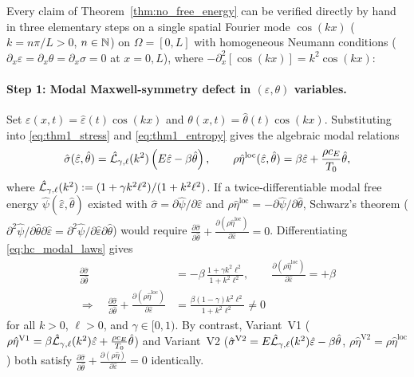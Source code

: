 Every claim of Theorem~\ref{thm:no_free_energy} can be verified directly by hand in three elementary steps on a single spatial Fourier mode $\cos(kx)$ ($k = n\pi/L > 0$, $n \in \mathbb{N}$) on $\Omega = [0,L]$ with homogeneous Neumann conditions ($\partial_x\varepsilon = \partial_x\theta = \partial_x\sigma = 0$ at $x=0,L$), where $-\partial_x^2[\cos(kx)] = k^2\cos(kx)$:

\paragraph{Step 1: Modal Maxwell-symmetry defect in $(\varepsilon,\theta)$ variables.}
Set $\varepsilon(x,t) = \hat{\varepsilon}(t)\cos(kx)$ and $\theta(x,t) = \hat{\theta}(t)\cos(kx)$. Substituting into \eqref{eq:thm1_stress} and \eqref{eq:thm1_entropy} gives the algebraic modal relations
\begin{equation}\label{eq:hc_modal_laws}
  \hat{\sigma}(\hat{\varepsilon},\hat{\theta}) = \hat{\mathcal{L}}_{\gamma,\ell}(k^2)\left(E\hat{\varepsilon} - \beta\hat{\theta}\right), \qquad
  \rho\hat{\eta}^{\mathrm{loc}}(\hat{\varepsilon},\hat{\theta}) = \beta\hat{\varepsilon} + \frac{\rho c_E}{T_0}\hat{\theta},
\end{equation}
where $\hat{\mathcal{L}}_{\gamma,\ell}(k^2) := (1 + \gamma k^2\ell^2)/(1 + k^2\ell^2)$. If a twice-differentiable modal free energy $\hat{\psi}(\hat{\varepsilon},\hat{\theta})$ existed with $\hat{\sigma} = \partial\hat{\psi}/\partial\hat{\varepsilon}$ and $\rho\hat{\eta}^{\mathrm{loc}} = -\partial\hat{\psi}/\partial\hat{\theta}$, Schwarz's theorem ($\partial^2\hat{\psi}/\partial\hat{\theta}\partial\hat{\varepsilon} = \partial^2\hat{\psi}/\partial\hat{\varepsilon}\partial\hat{\theta}$) would require $\frac{\partial\hat{\sigma}}{\partial\hat{\theta}} + \frac{\partial(\rho\hat{\eta}^{\mathrm{loc}})}{\partial\hat{\varepsilon}} = 0$. Differentiating \eqref{eq:hc_modal_laws} gives
\begin{align}\label{eq:hc_maxwell_defect}
  \frac{\partial\hat{\sigma}}{\partial\hat{\theta}} &= -\beta\,\frac{1 + \gamma k^2\ell^2}{1 + k^2\ell^2}, \qquad
  \frac{\partial(\rho\hat{\eta}^{\mathrm{loc}})}{\partial\hat{\varepsilon}} = +\beta \nonumber\\
  \Longrightarrow\quad \frac{\partial\hat{\sigma}}{\partial\hat{\theta}} + \frac{\partial(\rho\hat{\eta}^{\mathrm{loc}})}{\partial\hat{\varepsilon}} &= \frac{\beta(1-\gamma)k^2\ell^2}{1 + k^2\ell^2} \neq 0
\end{align}
for all $k > 0$, $\ell > 0$, and $\gamma \in [0,1)$. By contrast, Variant~V1 ($\rho\hat{\eta}^{\mathrm{V1}} = \beta\hat{\mathcal{L}}_{\gamma,\ell}(k^2)\hat{\varepsilon} + \frac{\rho c_E}{T_0}\hat{\theta}$) and Variant~V2 ($\hat{\sigma}^{\mathrm{V2}} = E\hat{\mathcal{L}}_{\gamma,\ell}(k^2)\hat{\varepsilon} - \beta\hat{\theta}$, $\rho\hat{\eta}^{\mathrm{V2}} = \rho\hat{\eta}^{\mathrm{loc}}$) both satisfy $\frac{\partial\hat{\sigma}}{\partial\hat{\theta}} + \frac{\partial(\rho\hat{\eta})}{\partial\hat{\varepsilon}} = 0$ identically.

